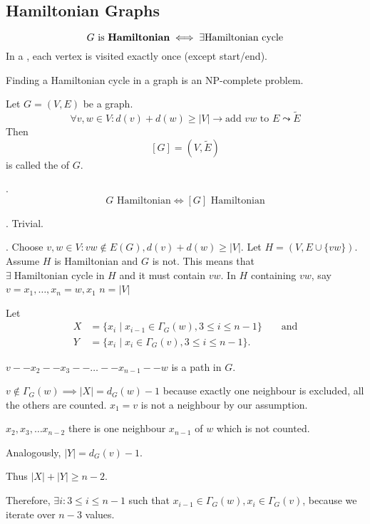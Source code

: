 
\subsection*{Hamiltonian Graphs}

\begin{definition}
\[
    \text{$G$ is \textbf{Hamiltonian}} \iff \exists \text{Hamiltonian cycle}
\]
In a , each vertex is visited exactly once (except start/end).
\end{definition}

Finding a Hamiltonian cycle in a graph is an NP-complete problem.

\begin{definition}
Let $G=(V,E)$ be a graph.
\[
\forall v,w\in V : d(v)+d(w) ≥ |V| \rightarrow\text{add $vw$ to $E$}\leadsto \tilde E
\]
Then
\[
    [G] = (V,\tilde E)
\]
is called the  of $G$.
\end{definition}

\Theorem.
\[
    G\text{ Hamiltonian} \iff [G]\text{ Hamiltonian}
\]

\ProofForward.
Trivial.

\ProofBackward.
Choose $v,w\in V: vw \not\in E(G), d(v)+d(w) ≥ |V|$.
Let $H=(V,E\cup \{vw\})$. Assume $H$ is Hamiltonian and $G$ is not.
This means that $\exists\;\text{Hamiltonian cycle in $H$}$ and it must contain $vw$.
In $H$ containing $vw$, say $v=x_1,\ldots,x_n=w,x_1$ 
$n=|V|$

Let
\begin{align*}
    X &=\{x_i \mid x_{i-1}\in \Gamma_G(w), 3 ≤ i ≤ n-1 \} &&\text{ and} \\
    Y &=\{x_i \mid x_i\in \Gamma_G(v), 3 ≤ i ≤ n-1 \}.
\end{align*}

$v -- x_2 -- x_3 -- \ldots -- x_{n-1} -- w$ is a path in $G$.

$v \not\in \Gamma_G(w) \implies |X| = d_G(w) - 1$
because exactly one neighbour is excluded, all the others are counted. $x_1= v$ is not a neighbour by our assumption.

$x_2, x_3, \ldots x_{n-2}$ there is one neighbour $x_{n-1}$ of $w$ which is not counted. 

Analogously,
$|Y| = d_G(v) - 1$.

Thus $|X| + |Y| \geq n-2$.

Therefore, $\exists i: 3 ≤ i ≤ n-1$ such that
$x_{i-1}\in \Gamma_G(w), x_i\in\Gamma_G(v)$, because we iterate over $n-3$ values.

